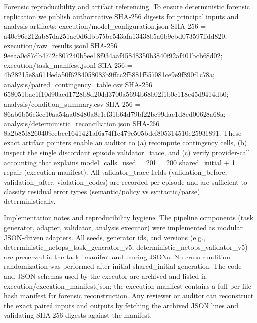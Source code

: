 \documentclass[conference]{IEEEtran}
\begin{document}
Forensic reproducibility and artifact referencing. To ensure deterministic forensic replication we publish authoritative SHA‑256 digests for principal inputs and analysis artifacts: execution/model\_configuration.json SHA-256 = a40e96e212ab87da251ac0d6dbb75bc543afa13438b5a6b9ebd073597ffdd820; execution/raw\_results.jsonl SHA-256 = 9eeaa0c87db4742c807240b5ee18f934aaf45848350b3840f92af401bcb68d02; execution/task\_manifest.jsonl SHA-256 = 4b28215e8a611feda50f6284058083b9ffcc2f5881f557081ce9e9f890f1c78a; analysis/paired\_contingency\_table.csv SHA-256 = 658051bae1f10d90aed1728b8d20dd3700a5694b68b02f1b0c118c45d9414db0; analysis/condition\_summary.csv SHA-256 = 86ab6b56e3ec10aa54aa08480a8e1ef31b64d79bf22bc99dac1d8ed00628a68a; analysis/deterministic\_reconciliation.json SHA-256 = 8a2b85f8260409eebce1641421af6a74f1c479e505bdef805314510e25931891. These exact artifact pointers enable an auditor to (a) recompute contingency cells, (b) inspect the single discordant episode validator\_trace, and (c) verify provider-call accounting that explains model\_calls\_used = 201 = 200 shared\_initial + 1 repair (execution manifest). All validator\_trace fields (validation\_before, validation\_after, violation\_codes) are recorded per episode and are sufficient to classify residual error types (semantic/policy vs syntactic/parse) deterministically.

Implementation notes and reproducibility hygiene. The pipeline components (task generator, adapter, validator, analysis executor) were implemented as modular JSON‑driven adapters. All seeds, generator ids, and versions (e.g., deterministic\_netops\_task\_generator\_v5, deterministic\_netops\_validator\_v5) are preserved in the task\_manifest and scoring JSONs. No cross-condition randomization was performed after initial shared\_initial generation. The code and JSON schemas used by the executor are archived and listed in execution/execution\_manifest.json; the execution manifest contains a full per-file hash manifest for forensic reconstruction. Any reviewer or auditor can reconstruct the exact paired inputs and outputs by fetching the archived JSON lines and validating SHA‑256 digests against the manifest.
\end{document}

